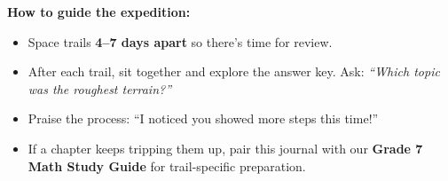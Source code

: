 {\begin{tcolorbox}
    \medskip
    \textbf{How to guide the expedition:}
    \begin{itemize}[leftmargin=*, itemsep=1pt]
        \item Space trails \textbf{4--7 days apart} so there's time for review.
        \item After each trail, sit together and explore the answer key. Ask:
            \textit{``Which topic was the roughest terrain?''}
        \item Praise the process: ``I noticed you showed more steps this time!''
        \item If a chapter keeps tripping them up, pair this journal with our
            \textbf{Grade 7 Math Study Guide} for trail-specific preparation.
    \end{itemize}
\end{tcolorbox}

}

\newpage
